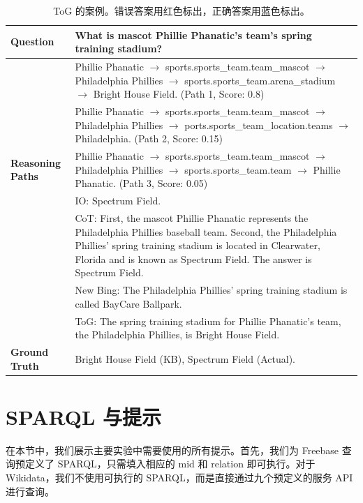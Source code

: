 \documentclass[11pt,UTF8,fontset=fandol]{ctexart}
\newcommand{\wrong}[1]{\textcolor{wrongred}{#1}}
\newcommand{\correct}[1]{\textcolor{rightblue}{#1}}
\begin{document}
\begin{table}[H]\centering
\caption{ToG 的案例。错误答案用\wrong{红色}标出，正确答案用\correct{蓝色}标出。}
\label{tab:22}
\small
\renewcommand{\arraystretch}{1.25}
\begin{tabular}{p{}p{}}
\toprule
\textbf{Question} & What is mascot Phillie Phanatic's team's spring training stadium? \\
\midrule
\multirow{5}{*}{\parbox{0.16\textwidth}{\textbf{Reasoning Paths}}}
& Phillie Phanatic $\rightarrow$ sports.sports\_team.team\_mascot $\rightarrow$ Philadelphia Phillies $\rightarrow$ sports.sports\_team.arena\_stadium $\rightarrow$ Bright House Field. (Path 1, Score: 0.8) \\
& Phillie Phanatic $\rightarrow$ sports.sports\_team.team\_mascot $\rightarrow$ Philadelphia Phillies $\rightarrow$ ports.sports\_team\_location.teams $\rightarrow$ Philadelphia. (Path 2, Score: 0.15) \\
& Phillie Phanatic $\rightarrow$ sports.sports\_team.team\_mascot $\rightarrow$ Philadelphia Phillies $\rightarrow$ sports.sports\_team.team $\rightarrow$ Phillie Phanatic. (Path 3, Score: 0.05) \\
\midrule
\multirow{5}{*}{\textbf{Outputs}}
& IO: \wrong{Spectrum Field.} \\
& CoT: First, the mascot Phillie Phanatic represents the Philadelphia Phillies baseball team. Second, the Philadelphia Phillies' spring training stadium is located in Clearwater, Florida and is known as \wrong{Spectrum Field}. The answer is Spectrum Field. \\
& New Bing: The Philadelphia Phillies' spring training stadium is called \wrong{BayCare Ballpark}. \\
& ToG: The spring training stadium for Phillie Phanatic's team, the Philadelphia Phillies, is \correct{Bright House Field}. \\
\midrule
\textbf{Ground Truth} & Bright House Field (KB), Spectrum Field (Actual). \\
\bottomrule
\end{tabular}
\end{table}

\section{SPARQL 与提示}

在本节中，我们展示主要实验中需要使用的所有提示。首先，我们为 Freebase 查询预定义了 SPARQL，只需填入相应的 mid 和 relation 即可执行。对于 Wikidata，我们不使用可执行的 SPARQL，而是直接通过九个预定义的服务 API 进行查询。
\end{document}
